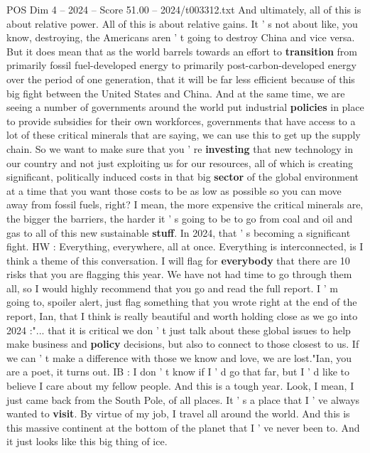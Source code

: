 \begin{textsample}{POS Dim 4 – 2024 – Score 51.00 – 2024/t003312.txt}
And ultimately, all of this is about relative power.
All of this is about relative gains.
It ' s not about like, you know, destroying, the Americans aren ' t going to destroy China and vice versa.
But it does mean that as the world barrels towards an effort to \textbf{transition} from primarily fossil fuel-developed energy to primarily post-carbon-developed energy over the period of one generation, that it will be far less efficient because of this big fight between the United States and China.
And at the same time, we are seeing a number of governments around the world put industrial \textbf{policies} in place to provide subsidies for their own workforces, governments that have access to a lot of these critical minerals that are saying, we can use this to get up the supply chain.
So we want to make sure that you ' re \textbf{investing} that new technology in our country and not just exploiting us for our resources, all of which is creating significant, politically induced costs in that big \textbf{sector} of the global environment at a time that you want those costs to be as low as possible so you can move away from fossil fuels, right?
I mean, the more expensive the critical minerals are, the bigger the barriers, the harder it ' s going to be to go from coal and oil and gas to all of this new sustainable \textbf{stuff}.
In 2024, that ' s becoming a significant fight.
HW : Everything, everywhere, all at once.
Everything is interconnected, is I think a theme of this conversation.
I will flag for \textbf{everybody} that there are 10 risks that you are flagging this year.
We have not had time to go through them all, so I would highly recommend that you go and read the full report.
I ' m going to, spoiler alert, just flag something that you wrote right at the end of the report, Ian, that I think is really beautiful and worth holding close as we go into 2024 :"... that it is critical we don ' t just talk about these global issues to help make business and \textbf{policy} decisions, but also to connect to those closest to us.
If we can ' t make a difference with those we know and love, we are lost."Ian, you are a poet, it turns out.
IB : I don ' t know if I ' d go that far, but I ' d like to believe I care about my fellow people.
And this is a tough year.
Look, I mean, I just came back from the South Pole, of all places.
It ' s a place that I ' ve always wanted to \textbf{visit}.
By virtue of my job, I travel all around the world.
And this is this massive continent at the bottom of the planet that I ' ve never been to.
And it just looks like this big thing of ice.

\end{textsample}
